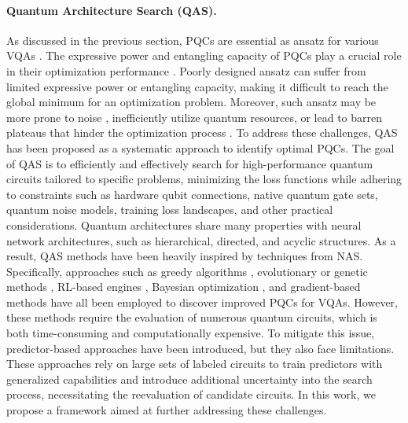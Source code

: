 \documentclass{article} %
\begin{document}
\paragraph{Quantum Architecture Search (QAS).} As discussed in the previous section, PQCs are essential as ansatz for various VQAs \citep{benedetti2019parameterized}. The expressive power and entangling capacity of PQCs play a crucial role in their optimization performance \citep{sim2019expressibility}. Poorly designed ansatz can suffer from limited expressive power or entangling capacity, making it difficult to reach the global minimum for an optimization problem. Moreover, such ansatz may be more prone to noise \citep{stilck2021limitations}, inefficiently utilize quantum resources, or lead to barren plateaus that hinder the optimization process \citep{mcclean2018barren, wang2021noise}. To address these challenges, QAS has been proposed as a systematic approach to identify optimal PQCs. The goal of QAS is to efficiently and effectively search for high-performance quantum circuits tailored to specific problems, minimizing the loss functions while adhering to constraints such as hardware qubit connections, native quantum gate sets, quantum noise models, training loss landscapes, and other practical considerations. Quantum architectures share many properties with neural network architectures, such as hierarchical, directed, and acyclic structures. As a result, QAS methods have been heavily inspired by techniques from NAS. Specifically, approaches such as greedy algorithms \citep{mitarai2018quantum, tang2021qubit}, evolutionary or genetic methods \citep{zhang2022evolutionary, ding2022evolutionary}, RL-based engines \citep{kuo2021quantum, ostaszewski2021reinforcement}, Bayesian optimization \citep{duong2022quantum}, and gradient-based methods \citep{zhang2022differentiable} have all been employed to discover improved PQCs for VQAs. However, these methods require the evaluation of numerous quantum circuits, which is both time-consuming and computationally expensive. To mitigate this issue, predictor-based approaches \citep{zhang2021neural, he2023gnn} have been introduced, but they also face limitations. These approaches rely on large sets of labeled circuits to train predictors with generalized capabilities and introduce additional uncertainty into the search process, necessitating the reevaluation of candidate circuits. In this work, we propose a framework aimed at further addressing these challenges.
\end{document}
